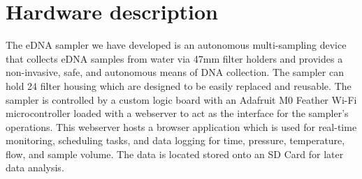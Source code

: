 \documentclass[11pt, letterpaper]{article}
\begin{document}
\section{Hardware description}





The eDNA sampler we have developed is an autonomous multi-sampling device that collects eDNA samples from water via 47mm filter holders and provides a non-invasive, safe, and autonomous means of DNA collection. The sampler can hold 24 filter housing which are designed to be easily replaced and reusable. The sampler is controlled by a custom logic board with an Adafruit M0 Feather Wi-Fi microcontroller loaded with a webserver to act as the interface for the sampler’s operations. This webserver hosts a browser application which is used for real-time monitoring, scheduling tasks, and data logging for time, pressure, temperature, flow, and sample volume. The data is located stored onto an SD Card for later data analysis. 
\end{document}
